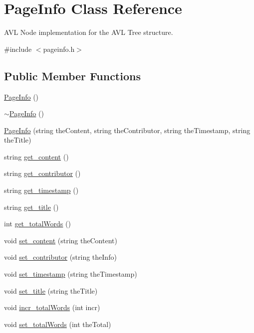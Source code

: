 \hypertarget{class_page_info}{}\section{Page\+Info Class Reference}
\label{class_page_info}


A\+V\+L Node implementation for the A\+V\+L Tree structure.  




{\ttfamily \#include $<$pageinfo.\+h$>$}

\subsection*{Public Member Functions}
\begin{DoxyCompactItemize}
\item 
\hyperlink{class_page_info_a3ab3b93ca3b3d09645d5e187863b84e6}{Page\+Info} ()
\item 
\hyperlink{class_page_info_a45259793eed3f830dadecfde0e970ec5}{$\sim$\+Page\+Info} ()
\item 
\hyperlink{class_page_info_aa98a49dd45fdea434a27e4892dbdf032}{Page\+Info} (string the\+Content, string the\+Contributor, string the\+Timestamp, string the\+Title)
\item 
string \hyperlink{class_page_info_a61bd04fcecb67f3fac9833cd4a0e432b}{get\+\_\+content} ()
\item 
string \hyperlink{class_page_info_a6569fb1fd2a7efa4a6d144aa87c27912}{get\+\_\+contributor} ()
\item 
string \hyperlink{class_page_info_ab2fa01ac638b965912b93fce36d4899a}{get\+\_\+timestamp} ()
\item 
string \hyperlink{class_page_info_a0985d632ae64c913fe976bedccaf5d31}{get\+\_\+title} ()
\item 
int \hyperlink{class_page_info_a40938f3d2f1c81079abcbe8051143d53}{get\+\_\+total\+Words} ()
\item 
void \hyperlink{class_page_info_afaf6005be3e5fa629619038a96fbd1af}{set\+\_\+content} (string the\+Content)
\item 
void \hyperlink{class_page_info_afb03f9cd31ec6e6f500393cd5c7e1037}{set\+\_\+contributor} (string the\+Info)
\item 
void \hyperlink{class_page_info_ad8f8aada94adc772c9739f5dcb3223a7}{set\+\_\+timestamp} (string the\+Timestamp)
\item 
void \hyperlink{class_page_info_a0808f61697bbeca2d717d9b55b233ae1}{set\+\_\+title} (string the\+Title)
\item 
void \hyperlink{class_page_info_a43de865e72ac2fc61f124e2acee9da4d}{incr\+\_\+total\+Words} (int incr)
\item 
void \hyperlink{class_page_info_adcd293f9d6bdc291f7f28663e7151c45}{set\+\_\+total\+Words} (int the\+Total)
\end{DoxyCompactItemize}
